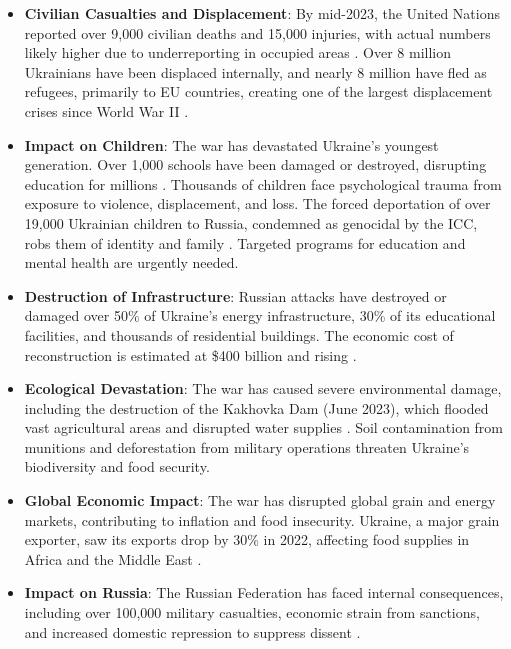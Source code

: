 \documentclass[a4paper,12pt]{article}
\begin{document}
\begin{itemize}
    \item \textbf{Civilian Casualties and Displacement}: By mid-2023, the United Nations reported over 9,000 civilian deaths and 15,000 injuries, with actual numbers likely higher due to underreporting in occupied areas \cite{un_2023}. Over 8 million Ukrainians have been displaced internally, and nearly 8 million have fled as refugees, primarily to EU countries, creating one of the largest displacement crises since World War II \cite{unhcr_2023}.
    \item \textbf{Impact on Children}: The war has devastated Ukraine’s youngest generation. Over 1,000 schools have been damaged or destroyed, disrupting education for millions \cite{un_2023}. Thousands of children face psychological trauma from exposure to violence, displacement, and loss. The forced deportation of over 19,000 Ukrainian children to Russia, condemned as genocidal by the ICC, robs them of identity and family \cite{icc_2023}. Targeted programs for education and mental health are urgently needed.
    \item \textbf{Destruction of Infrastructure}: Russian attacks have destroyed or damaged over 50\% of Ukraine’s energy infrastructure, 30\% of its educational facilities, and thousands of residential buildings. The economic cost of reconstruction is estimated at \$400 billion and rising \cite{world_bank_2023}.
    \item \textbf{Ecological Devastation}: The war has caused severe environmental damage, including the destruction of the Kakhovka Dam (June 2023), which flooded vast agricultural areas and disrupted water supplies \cite{eco_impact_2023}. Soil contamination from munitions and deforestation from military operations threaten Ukraine’s biodiversity and food security.
    \item \textbf{Global Economic Impact}: The war has disrupted global grain and energy markets, contributing to inflation and food insecurity. Ukraine, a major grain exporter, saw its exports drop by 30\% in 2022, affecting food supplies in Africa and the Middle East \cite{world_bank_2023}.
    \item \textbf{Impact on Russia}: The Russian Federation has faced internal consequences, including over 100,000 military casualties, economic strain from sanctions, and increased domestic repression to suppress dissent \cite{osce_2023}.
\end{itemize}

\begin{center}
\end{center}
\end{document}
